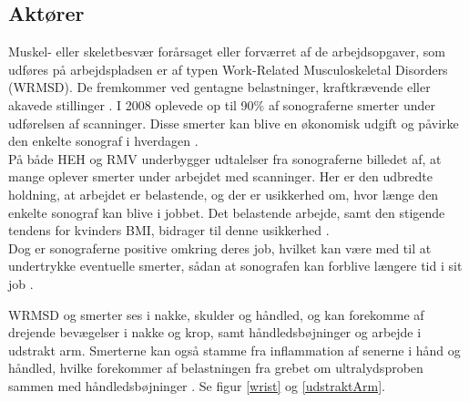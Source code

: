 \subsection{Aktører} \label{aktoerer_organisation}
Muskel- eller skeletbesvær forårsaget eller forværret af de arbejdsopgaver, som udføres på arbejdspladsen er af typen Work-Related Musculoskeletal Disorders (WRMSD). De fremkommer ved gentagne belastninger, kraftkrævende eller akavede stillinger \cite{24}. I 2008 oplevede op til 90\% af sonograferne smerter under udførelsen af scanninger. Disse smerter kan blive en økonomisk udgift og påvirke den enkelte sonograf i hverdagen \cite{24}\cite{31}\cite{36}\cite{30}.\\
På både HEH og RMV underbygger udtalelser fra sonograferne billedet af, at mange oplever smerter under arbejdet med scanninger. 
Her er den udbredte holdning, at arbejdet er belastende, og der er usikkerhed om, hvor længe den enkelte sonograf kan blive i jobbet. Det belastende arbejde, samt den stigende tendens for kvinders BMI, bidrager til denne usikkerhed \cite{24}\cite{31}\cite{kvinderovervaegt}. \\
Dog er sonograferne positive omkring deres job, hvilket kan være med til at undertrykke eventuelle smerter, sådan at sonografen kan forblive længere tid i sit job \cite{1}\cite{24}.

WRMSD og smerter ses i nakke, skulder og håndled, og kan forekomme af drejende bevægelser i nakke og krop, samt håndledsbøjninger og arbejde i udstrakt arm. Smerterne kan også stamme fra inflammation af senerne i hånd og håndled, hvilke forekommer af belastningen fra grebet om ultralydsproben sammen med håndledsbøjninger \cite{1}\cite{24}\cite{31}\cite{32}\cite{36}. Se figur \ref{wrist} og \ref{udstraktArm}.

